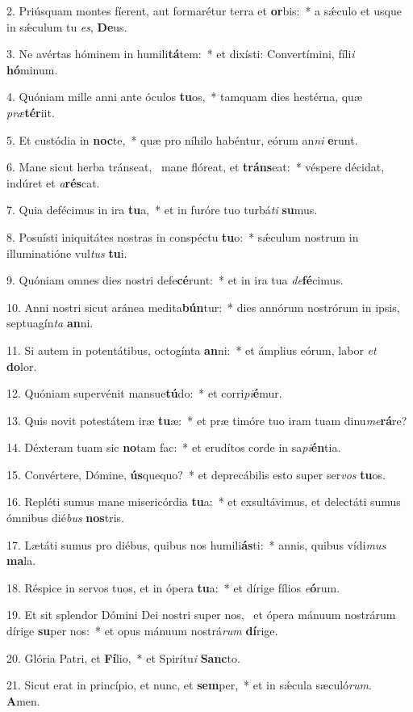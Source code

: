 2. Priúsquam montes fíerent, aut formarétur terra et \textbf{or}bis:~*  a sǽculo et usque in sǽculum tu \textit{es}, \textbf{De}us.\

3. Ne avértas hóminem in humili\textbf{tá}tem:~*  et dixísti: Convertímini, fíli\textit{i} \textbf{hó}minum.\

4. Quóniam mille anni ante óculos \textbf{tu}os,~*  tamquam dies hestérna, quæ \textit{præ}\textbf{tér}iit.\

5. Et custódia in \textbf{noc}te,~*  quæ pro níhilo habéntur, eórum an\textit{ni} \textbf{e}runt.\

6. Mane sicut herba tránseat, \dag\  mane flóreat, et \textbf{tráns}eat:~*  véspere décidat, indúret et \textit{a}\textbf{rés}cat.\

7. Quia defécimus in ira \textbf{tu}a,~*  et in furóre tuo turbá\textit{ti} \textbf{su}mus.\

8. Posuísti iniquitátes nostras in conspéctu \textbf{tu}o:~*  sǽculum nostrum in illuminatióne vul\textit{tus} \textbf{tu}i.\

9. Quóniam omnes dies nostri defe\textbf{cé}runt:~*  et in ira tua \textit{de}\textbf{fé}cimus.\

10. Anni nostri sicut aránea medita\textbf{bún}tur:~*  dies annórum nostrórum in ipsis, septuagín\textit{ta} \textbf{an}ni.\

11. Si autem in potentátibus, octogínta \textbf{an}ni:~*  et ámplius eórum, labor \textit{et} \textbf{do}lor.\

12. Quóniam supervénit mansue\textbf{tú}do:~*  et corri\textit{pi}\textbf{é}mur.\

13. Quis novit potestátem iræ \textbf{tu}æ:~*  et præ timóre tuo iram tuam dinu\textit{me}\textbf{rá}re?\

14. Déxteram tuam sic \textbf{no}tam fac:~*  et erudítos corde in sa\textit{pi}\textbf{én}tia.\

15. Convértere, Dómine, \textbf{ús}quequo?~*  et deprecábilis esto super ser\textit{vos} \textbf{tu}os.\

16. Repléti sumus mane misericórdia \textbf{tu}a:~*  et exsultávimus, et delectáti sumus ómnibus dié\textit{bus} \textbf{nos}tris.\

17. Lætáti sumus pro diébus, quibus nos humili\textbf{ás}ti:~*  annis, quibus vídi\textit{mus} \textbf{ma}la.\

18. Réspice in servos tuos, et in ópera \textbf{tu}a:~*  et dírige fílios \textit{e}\textbf{ó}rum.\

19. Et sit splendor Dómini Dei nostri super nos, \dag\  et ópera mánuum nostrárum dírige \textbf{su}per nos:~*  et opus mánuum nostrá\textit{rum} \textbf{dí}rige.\

20. Glória Patri, et \textbf{Fí}lio,~*  et Spirítu\textit{i} \textbf{Sanc}to.\

21. Sicut erat in princípio, et nunc, et \textbf{sem}per,~*  et in sǽcula sæculó\textit{rum}. \textbf{A}men.\

